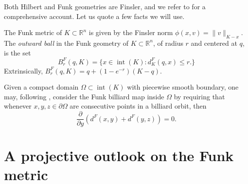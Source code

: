 \documentclass[reqno,10pt]{amsart}
\newcounter{mp}
\DeclareMathOperator{\inter}{int}
\newcommand{\R}{\mathbb{R}}
\begin{document}
Both Hilbert and Funk geometries are Finsler, and we refer to \cite{hilbert_handbook} for a comprehensive account. Let us quote a few facts we will use. 

The Funk metric of $K\subset\R^n$ is given by the Finsler norm $\phi(x,v)=\|v\|_{K-x}$. The \emph{outward ball} in the Funk geometry of $K\subset\R^n$, of radius $r$ and centered at $q$, is the set
$$B_r^F(q, K)=\{x\in \inter(K): d^F_K(q,x)\leq r.\}$$
Extrinsically, $B^F_r(q, K)=q+(1-e^{-r})(K-q)$.

Given a compact domain $\Omega\subset \inter(K)$ with piecewise smooth boundary, one may, following \cite{gutkin_tabachnikov}, consider the Funk billiard map inside $\Omega$ by requiring that whenever $x,y,z\in\partial \Omega$ are consecutive points in a billiard orbit, then $$\frac{\partial}{\partial y}(d^F(x,y)+d^F(y,z))=0.$$


\section{A projective outlook on the Funk metric} \label{sec:outlook}
\end{document}
